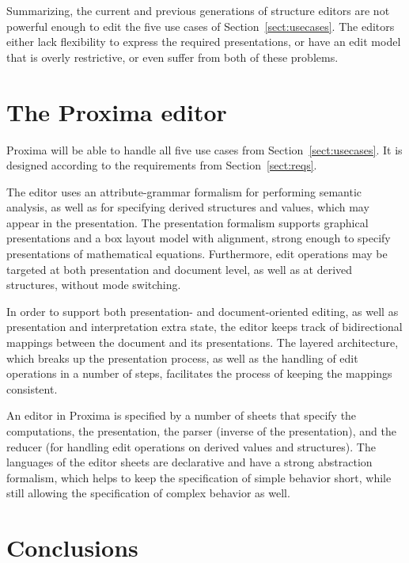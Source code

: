 \documentclass{speauth}
\begin{document}
Summarizing, the current and previous generations of structure editors are not powerful enough to edit the five use cases of Section~\ref{sect:usecases}. The editors either lack flexibility to express the required presentations, or have an edit model that is overly restrictive, or even suffer from both of these problems. 

\section{The Proxima editor}\label{sect:proxEditor}

Proxima will be able to handle all five use cases from Section~\ref{sect:usecases}. It is designed according to the requirements from Section~\ref{sect:reqs}.

The editor uses an attribute-grammar formalism for performing semantic analysis, as well as for specifying derived structures and values, which may appear in the presentation. The presentation formalism supports graphical presentations and a box layout model with alignment, strong enough to specify presentations of mathematical equations. Furthermore, edit operations may be targeted at both presentation and document level, as well as at derived structures, without mode switching.

In order to support both presentation- and document-oriented editing, as well as presentation and interpretation extra state, the editor keeps track of bidirectional mappings between the document and its presentations. The layered architecture, which breaks up the presentation process, as well as the handling of edit operations in a number of steps, facilitates the process of keeping the mappings consistent. 


An editor in Proxima is specified by a number of sheets that specify the computations, the presentation, the parser (inverse of the presentation), and the reducer (for handling edit operations on derived values and structures). The languages of the editor sheets are declarative and have a strong abstraction formalism, which helps to keep the specification of simple behavior short, while still allowing the specification of complex behavior as well.

\section{Conclusions}
\end{document}
